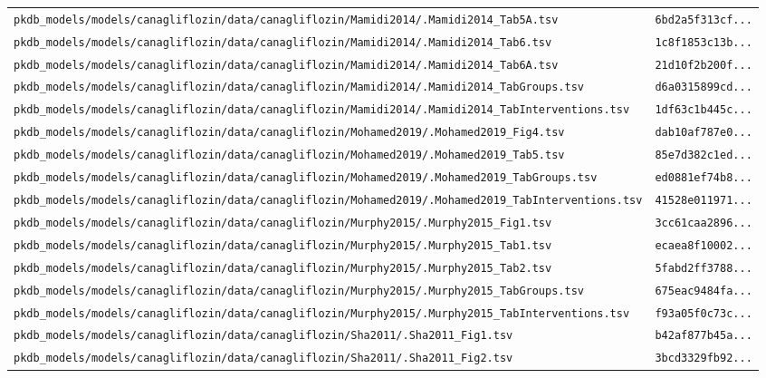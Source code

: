 \begin{longtable}{ll}
\texttt{pkdb\_models/models/canagliflozin/data/canagliflozin/Mamidi2014/.Mamidi2014\_Tab5A.tsv} & \texttt{6bd2a5f313cf...} \\
\texttt{pkdb\_models/models/canagliflozin/data/canagliflozin/Mamidi2014/.Mamidi2014\_Tab6.tsv} & \texttt{1c8f1853c13b...} \\
\texttt{pkdb\_models/models/canagliflozin/data/canagliflozin/Mamidi2014/.Mamidi2014\_Tab6A.tsv} & \texttt{21d10f2b200f...} \\
\texttt{pkdb\_models/models/canagliflozin/data/canagliflozin/Mamidi2014/.Mamidi2014\_TabGroups.tsv} & \texttt{d6a0315899cd...} \\
\texttt{pkdb\_models/models/canagliflozin/data/canagliflozin/Mamidi2014/.Mamidi2014\_TabInterventions.tsv} & \texttt{1df63c1b445c...} \\
\texttt{pkdb\_models/models/canagliflozin/data/canagliflozin/Mohamed2019/.Mohamed2019\_Fig4.tsv} & \texttt{dab10af787e0...} \\
\texttt{pkdb\_models/models/canagliflozin/data/canagliflozin/Mohamed2019/.Mohamed2019\_Tab5.tsv} & \texttt{85e7d382c1ed...} \\
\texttt{pkdb\_models/models/canagliflozin/data/canagliflozin/Mohamed2019/.Mohamed2019\_TabGroups.tsv} & \texttt{ed0881ef74b8...} \\
\texttt{pkdb\_models/models/canagliflozin/data/canagliflozin/Mohamed2019/.Mohamed2019\_TabInterventions.tsv} & \texttt{41528e011971...} \\
\texttt{pkdb\_models/models/canagliflozin/data/canagliflozin/Murphy2015/.Murphy2015\_Fig1.tsv} & \texttt{3cc61caa2896...} \\
\texttt{pkdb\_models/models/canagliflozin/data/canagliflozin/Murphy2015/.Murphy2015\_Tab1.tsv} & \texttt{ecaea8f10002...} \\
\texttt{pkdb\_models/models/canagliflozin/data/canagliflozin/Murphy2015/.Murphy2015\_Tab2.tsv} & \texttt{5fabd2ff3788...} \\
\texttt{pkdb\_models/models/canagliflozin/data/canagliflozin/Murphy2015/.Murphy2015\_TabGroups.tsv} & \texttt{675eac9484fa...} \\
\texttt{pkdb\_models/models/canagliflozin/data/canagliflozin/Murphy2015/.Murphy2015\_TabInterventions.tsv} & \texttt{f93a05f0c73c...} \\
\texttt{pkdb\_models/models/canagliflozin/data/canagliflozin/Sha2011/.Sha2011\_Fig1.tsv} & \texttt{b42af877b45a...} \\
\texttt{pkdb\_models/models/canagliflozin/data/canagliflozin/Sha2011/.Sha2011\_Fig2.tsv} & \texttt{3bcd3329fb92...} \\

\end{longtable}
